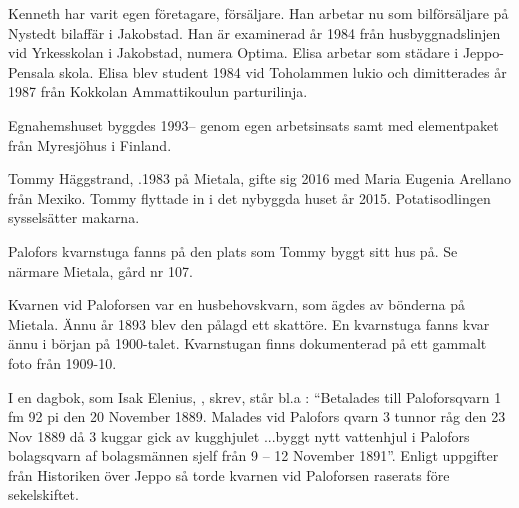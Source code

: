 Kenneth har varit egen företagare, försäljare. Han arbetar nu som bilförsäljare på Nystedt bilaffär i Jakobstad. Han är examinerad år 1984 från husbyggnadslinjen vid Yrkesskolan i Jakobstad, numera Optima. Elisa arbetar som städare i Jeppo-Pensala skola. Elisa blev student 1984 vid Toholammen lukio och dimitterades år 1987 från Kokkolan Ammattikoulun parturilinja.

Egnahemshuset byggdes 1993-- genom egen arbetsinsats samt med elementpaket från Myresjöhus i Finland.






Tommy Häggstrand,  .1983 på Mietala, gifte sig 2016 med Maria Eugenia Arellano från Mexiko. Tommy flyttade in i det nybyggda huset år 2015. Potatisodlingen sysselsätter makarna.

Palofors kvarnstuga fanns på den plats som Tommy byggt sitt hus på. Se närmare Mietala, gård nr 107.



\jhnooccupant{}


Kvarnen vid Paloforsen var en husbehovskvarn, som ägdes av bönderna på 	Mietala. Ännu år 1893 blev den pålagd ett skattöre. En kvarnstuga fanns kvar ännu i början på 1900-talet. Kvarnstugan finns dokumenterad på ett gammalt foto från 1909-10.

I en dagbok, som Isak Elenius, , skrev,  står bl.a : ``Betalades till Paloforsqvarn 1 fm 92 pi den 20 November 1889. Malades vid Palofors qvarn 3 tunnor råg den 23  Nov 1889 då 3 kuggar gick av kugghjulet 	...byggt nytt vattenhjul i Palofors bolagsqvarn af bolagsmännen sjelf från 9 – 12 November 1891''. Enligt uppgifter från Historiken över Jeppo så torde kvarnen vid Paloforsen raserats före sekelskiftet.


